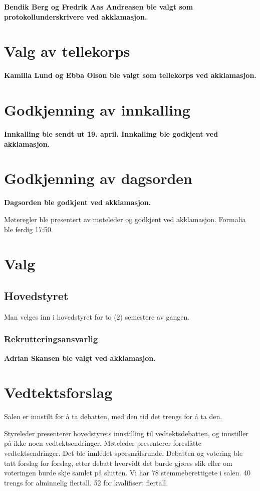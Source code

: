 \documentclass[10pt,norsk,a4paper,usenames,dvipsnames]{article}
\begin{document}
\textbf{Bendik Berg og Fredrik Aas Andreasen ble valgt som protokollunderskrivere ved akklamasjon.}

\section{Valg av tellekorps}

\textbf{Kamilla Lund og Ebba Olson ble valgt som tellekorps ved akklamasjon.}

\section{Godkjenning av innkalling}

\textbf{Innkalling ble sendt ut 19. april. Innkalling ble godkjent ved akklamasjon.}

\section{Godkjenning av dagsorden}

\textbf{Dagsorden ble godkjent ved akklamasjon.}

Møteregler ble presentert av møteleder og godkjent ved akklamasjon.
Formalia ble ferdig 17:50.
\section{Valg}

    \subsection{Hovedstyret}
        Man velges inn i hovedstyret for to (2) semestere av gangen.

    
    \subsubsection{Rekrutteringsansvarlig} 
    \textbf{Adrian Skansen ble valgt ved akklamasjon.}
    

\section{Vedtektsforslag}

Salen er innstilt for å ta debatten, med den tid det trengs for å ta den.

Styreleder presenterer hovedstyrets innstilling til vedtektsdebatten, og innstiller på ikke noen vedtektsendringer. Møteleder presenterer foreslåtte vedtektsendringer. Det ble innledet spørsmålsrunde. Debatten og votering ble tatt forslag for forslag, etter debatt hvorvidt det burde gjøres slik eller om voteringen burde skje samlet på slutten. Vi har 78 stemmeberettigete i salen. 40 trengs for alminnelig flertall. 52 for kvalifisert flertall. 
\end{document}
